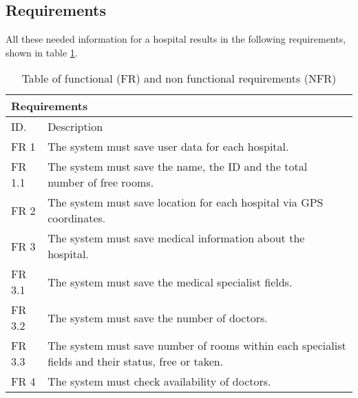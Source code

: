 
\subsection{Requirements}
All these needed information for a hospital results in the following requirements, shown in table \ref{tab_refs}.

\begin{table}
\centering
\caption{Table of functional (FR) and non functional requirements (NFR)}
\label{tab_refs}
\setlength{\extrarowheight}{0pt}
\addtolength{\extrarowheight}{\aboverulesep}
\addtolength{\extrarowheight}{\belowrulesep}
\setlength{\aboverulesep}{0pt}
\setlength{\belowrulesep}{0pt}
\begin{tabular}{|l|l|} 
\toprule
\multicolumn{2}{|l|}{{\cellcolor[rgb]{0.753,0.753,0.753}}Requirements}                                                                                                                        \\ 
\hline
ID.                                       & Description                                                                         \\ 
\hline
\hline
\rowcolor[rgb]{0.894,0.894,0.894} 
FR 1  & The system must save user data for each hospital.                                      
\\ 
\hline
FR 1.1 & The system must save the name, the ID and the total number of free rooms.                         
\\ 
\hline
\rowcolor[rgb]{0.894,0.894,0.894} 
FR 2  & The system must save location for each hospital via GPS coordinates.               
\\ 
\hline
FR 3  & The system must save medical information about the hospital.                       
\\ 
\hline
\rowcolor[rgb]{0.894,0.894,0.894} 
FR 3.1 & The system must save the medical specialist fields.                              
\\ 
\hline
FR 3.2  & The system must save the number of doctors.                                        
\\ 
\hline
\rowcolor[rgb]{0.894,0.894,0.894} 
FR 3.3   & The system must save number of rooms within each specialist fields and their status, free or taken.         
\\ 
\hline
FR 4 & The system must check availability of doctors.                                                                
\\ 

\end{tabular}
\end{table}
